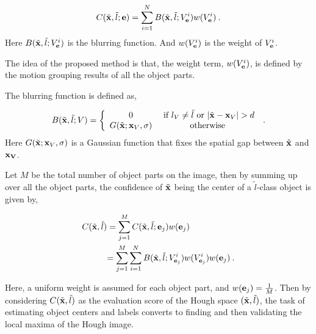\begin{equation}C({\tilde{\bf{x}}},\tilde{l};{\bf{e}}) = \sum\limits^N_{i=1} {B({\tilde{\bf{x}}},{\tilde{l}};{V_{\bf{e}}^i}) w({V_{\bf{e}}^i})}\:.
\label{eq1}
\end{equation}
Here $B({\tilde{\bf{x}}},{\tilde{l}};{V_{\bf{e}}^i})$ is the blurring function. And $w({V_{\bf{e}}^i})$ is the weight of ${V_{\bf{e}}^i}$.

The idea of the proposed method is that, the weight term, $w({V_{\bf{e}}^i})$, is defined by the motion grouping results of all the object parts.

The blurring function is defined as,

\begin{equation}
B(\tilde{\bf{x}},\tilde l;V)
= \left\{ \begin{array}{*{20}{c}}
   0   &\mbox{  if } {l_V} \ne \tilde{l} \mbox{ or } |\tilde{\bf{x}} - {\bf{x}}_V| > d   \\
   G(\tilde{\bf{x}};{{\bf{x}}_V},\sigma) &\mbox{otherwise}
\end{array} \right. \:.
\label{eq2}
\end{equation}
Here $G(\tilde{\bf{x}};{\bf{x}}_V,\sigma )$ is a Gaussian function that fixes the spatial gap between $\tilde{\bf{x}}$ and ${\bf{x}_V}$.

Let $M$ be the total number of object parts on the image, then by summing up over all the object parts, the confidence of $\tilde{\bf{x}}$ being the center of a $\tilde{l}$-class object is given by,

\begin{equation}
\begin{aligned}
C({\tilde{\bf{x}}},\tilde{l}) &=\sum\limits^M_{j=1} C({\tilde{\bf{x}}},\tilde{l};{\bf{e}}_j)w({\bf{e}}_j) \\
&{
\begin{aligned}
=\sum\limits^M_{j=1} \sum\limits^N_{i=1} {B({\tilde{\bf{x}}},{\tilde{l}};{V_{{\bf{e}}_j}^i}) w({V_{{\bf{e}}_j}^i})w({\bf{e}}_j)} \:.
\end{aligned}
}
\end{aligned}
\label{eq3}
\end{equation}

Here, a uniform weight is assumed for each object part, and $w({\bf{e}}_j)=\frac 1 M$. Then by considering $C({\tilde{\bf{x}}},\tilde{l})$ as the evaluation score of the Hough space $({\tilde{\bf{x}}},\tilde{l})$, the task of estimating object centers and labels converts to finding and then validating the local maxima of the Hough image.

